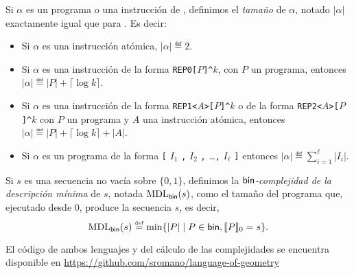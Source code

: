 Si $\alpha$ es un programa o una instrucción de \grambin, definimos el {\em tamaño} de $\alpha$, notado $|\alpha|$ exactamente igual que para \grambin. Es decir:
%
\begin{itemize}
\item Si $\alpha$ es una instrucción atómica, $|\alpha|\eqdef 2$.

\item Si $\alpha$ es una instrucción de la forma 
\verb#REP0[#$P$\verb#]^#$k$, con $P$ un programa, 
entonces $|\alpha|\eqdef |P|+\lceil \log k\rceil$.

\item Si $\alpha$ es una instrucción de la forma 
\verb#REP1<#$A$\verb#>[#$P$\verb#]^#$k$ o de la forma 
\verb#REP2<#$A$\verb#>[#$P$\verb#]^#$k$ 
con $P$ un programa y $A$ una instrucción atómica, 
entonces $|\alpha|\eqdef |P|+\lceil \log k\rceil+|A|$.

\item Si $\alpha$ es un programa de la forma
\verb#[# $I_1$ \verb#,# $I_2$ \verb#,# \dots \verb#,# $I_\ell$ \verb#]#
entonces $|\alpha|\eqdef \sum_{i=1}^\ell|I_i|$.
\end{itemize}
%
Si $s$ es una secuencia no vacía sobre $\{0,1\}$, definimos la {\em ${\sf bin}$-complejidad de la descripción mínima} de $s$, notada ${\rm MDL}_{{\sf bin}}(s)$, como el tamaño del programa que, ejecutado desde 0, produce la secuencia $s$, es decir,
$$
{\rm MDL}_{{\sf bin}}(s)\stackrel{\scriptscriptstyle \mathrm{def}}{=}\min\{|P|\mid P\in{\sf bin},\llbracket P\rrbracket_0=s\}.
$$


El código de ambos lenguajes y del cálculo de las complejidades se encuentra disponible en \hyperref[https://github.com/sromano/language-of-geometry]{\url{https://github.com/sromano/language-of-geometry}}

